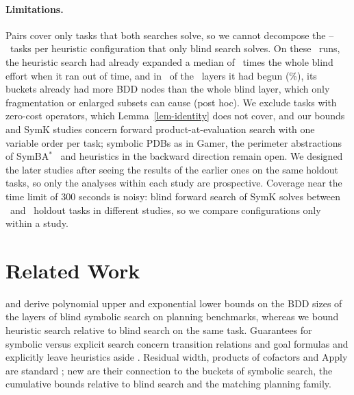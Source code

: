 \documentclass[letterpaper]{article}
\newcommand{\symba}{SymBA\ensuremath{^{*}}}
\theoremstyle{plain}
\theoremstyle{definition}
\theoremstyle{remark}
\begin{document}
\paragraph{Limitations.}
Pairs cover only tasks that both searches solve, so we cannot decompose the \PruneBlindOnlyMin--\PruneBlindOnlyMax\ tasks per heuristic configuration that only blind search solves.
On these \UnsolvedRuns\ runs, the heuristic search had already expanded a median of \UnsolvedEffortMedian\ times the whole blind effort when it ran out of time, and in \UnsolvedLayersAbove\ of the \UnsolvedLayers\ layers it had begun (\UnsolvedLayersPercent\%), its buckets already had more BDD nodes than the whole blind layer, which only fragmentation or enlarged subsets can cause (post hoc).
We exclude tasks with zero-cost operators, which Lemma~\ref{lem-identity} does not cover, and our bounds and SymK studies concern forward product-at-evaluation search with one variable order per task; symbolic PDBs as in Gamer, the perimeter abstractions of \symba\ \citep{torralba-et-al-ijcai2016a,torralba-et-al-aij2018} and heuristics in the backward direction remain open.
We designed the later studies after seeing the results of the earlier ones on the same holdout tasks, so only the analyses within each study are prospective.
Coverage near the time limit of 300 seconds is noisy: blind forward search of SymK solves between \RemSolvedBlindFw\ and \StBlindSolved\ holdout tasks in different studies, so we compare configurations only within a study.

\section{Related Work}

\citet{edelkamp-kissmann-aaai2008} and \citet{kissmann-phd2012} derive polynomial upper and exponential lower bounds on the BDD sizes of the layers of blind symbolic search on planning benchmarks, whereas we bound heuristic search relative to blind search on the same task.
Guarantees for symbolic versus explicit search concern transition relations and goal formulas and explicitly leave heuristics aside \citep{speck-helmert-ecai2025}.
Residual width, products of cofactors and Apply are standard \citep{wegener-2000,bryant-ieeecomp1986}; new are their connection to the buckets of symbolic search, the cumulative bounds relative to blind search and the matching planning family.
\end{document}
